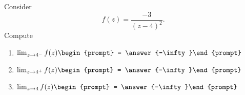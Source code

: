 \documentclass{ximera}
\author{Bart Snapp}
\begin{document}
\begin{exercise}
Consider 
\[
f(z) = \frac{-3}{(z-4)^2}.
\]
Compute
\begin{enumerate}
\item $\lim_{z\to 4^- } f(z) \begin{prompt} = \answer{-\infty}\end{prompt}$
\item $\lim_{z\to 4^+ } f(z) \begin{prompt} = \answer{-\infty}\end{prompt}$
\item $\lim_{z\to 4 } f(z) \begin{prompt} = \answer{-\infty}\end{prompt}$
\end{enumerate}
\end{exercise}
\end{document}

